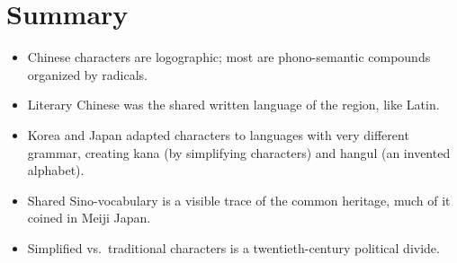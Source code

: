 \section*{Summary}
\begin{itemize}
  \item Chinese characters are logographic; most are phono-semantic compounds organized
        by radicals.
  \item Literary Chinese was the shared written language of the region, like Latin.
  \item Korea and Japan adapted characters to languages with very different grammar,
        creating kana (by simplifying characters) and hangul (an invented alphabet).
  \item Shared Sino-vocabulary is a visible trace of the common heritage, much of it
        coined in Meiji Japan.
  \item Simplified vs.\ traditional characters is a twentieth-century political divide.
\end{itemize}
